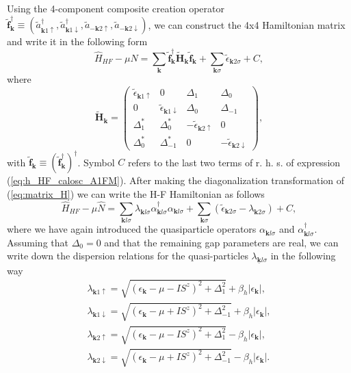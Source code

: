 \documentclass[aps,prb,showpacs,reprint]{revtex4-1}
\begin{document}
Using the 4-component composite creation operator 
$\mathbf{\tilde{f}}^{\dagger}_{\mathbf{k}}\equiv(\tilde{a}^{\dagger}
_{\mathbf{k}1\uparrow},\tilde{a}^{\dagger}_{\mathbf{k}
1\downarrow},\tilde{a}_{-\mathbf{k}2\uparrow},\tilde{a}_{-\mathbf{k}2\downarrow
})$, we can construct the 4x4 Hamiltonian matrix and write it in the following form
\begin{equation}
\hat{H}_{HF}-\mu\hat{N}=\sum_{\mathbf{k}}
\tilde{\mathbf{f}}_{\mathbf{k}}^{\dagger}\mathbf{\tilde{H}}_{
\mathbf{k}}\tilde{\mathbf{f}}_{\mathbf{k}}+\sum_{
\mathbf{k}\sigma}\tilde{\epsilon}_{\mathbf{k}2\sigma}+C,
\end{equation}
where
\begin{equation}
\mathbf{\tilde{H}}_{\mathbf{k}}=\left(\begin{array}{cccc}
\tilde{\epsilon}_{\mathbf{k}1\uparrow} & 0 & \Delta_1 & \Delta_{0}\\
0 & \tilde{\epsilon}_{\mathbf{k}1\downarrow} & \Delta_{0} &
\Delta_{-1}\\
\Delta_1^* & \Delta_0^* & -\tilde{\epsilon}_{\mathbf{k}2\uparrow} &
0\\
\Delta_0^* & \Delta_{-1}^* & 0 &
-\tilde{\epsilon}_{\mathbf{k}2\downarrow}
\end{array} \right),
\label{eq:matrix_H}
\end{equation}
with
$\mathbf{\tilde{f}}_{\mathbf{k}}\equiv(\mathbf{\tilde{f}}^{\dagger}_
{\mathbf{k}})^{\dagger}$. Symbol $C$ refers to the last two terms of r. h.
s. of expression (\ref{eq:h_HF_calosc_A1FM}).
After making the diagonalization transformation of (\ref{eq:matrix_H}) we can
write the H-F Hamiltonian as follows
\begin{equation}
\hat{H}_{HF}-\mu\hat{N}=\sum_{\mathbf{k}l\sigma}\lambda_{\mathbf{k}
l\sigma}\alpha^{\dagger}_{\mathbf{k}l\sigma}\alpha_{
\mathbf{k}l\sigma}+\sum_{\mathbf{k}\sigma}(\tilde{\epsilon}_{
\mathbf{k}2\sigma}-\lambda_{\mathbf{k}2\sigma})+C,
\label{eq:hamiltonian_final}
\end{equation}
where we have again introduced the quasiparticle operators
$\alpha_{\mathbf{k}l\sigma}$ and $\alpha^{\dagger}_{\mathbf{k}l\sigma}$.
Assuming that $\Delta_0=0$ and that the remaining gap parameters are real, we
can write down the dispersion relations for the quasi-particles
$\lambda_{\underline{\mathbf{k}}l\sigma}$ in the following way
\begin{equation}
\begin{split}
\lambda_{\mathbf{k}1\uparrow}=\sqrt{(\epsilon_{\mathbf{k
}}-\mu-IS^z)^2+\Delta_1^2}+\beta_h|\epsilon_{\mathbf{k}}|,\\
\lambda_{\mathbf{k}1\downarrow}=\sqrt{(\epsilon_{\mathbf{
k}}-\mu+IS^z)^2+\Delta_{-1}^2}+\beta_h|\epsilon_{\mathbf{k}}|,\\
\lambda_{\mathbf{k}2\uparrow}=\sqrt{(\epsilon_{\mathbf{k}
}-\mu-IS^z)^2+\Delta_1^2}-\beta_h|\epsilon_{\mathbf{k}}|,\\
\lambda_{\mathbf{k}2\downarrow}=\sqrt{(\epsilon_{\mathbf{
k}}-\mu+IS^z)^2+\Delta_{-1}^2}-\beta_h|\epsilon_{\mathbf{k}}|.\\
\end{split}
\label{eq:disp_rel_A_S}
\end{equation}
\end{document}
